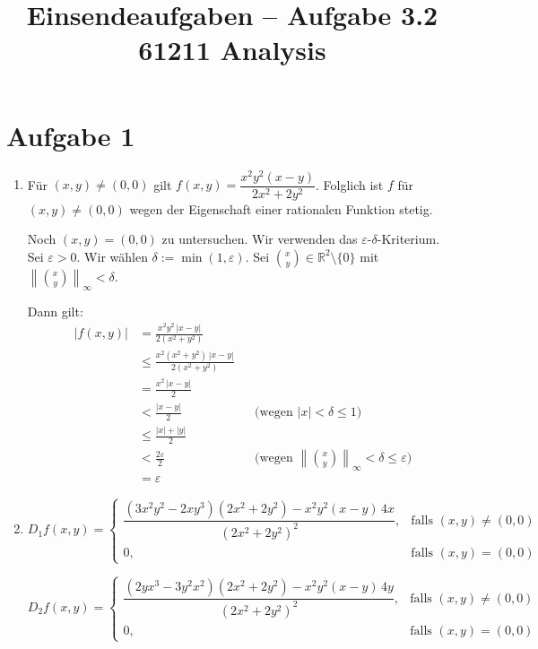 \documentclass[a4paper,12pt]{article}
\title{Einsendeaufgaben -- Aufgabe 3.2\\[0.5em]
\large 61211 Analysis}
\author{}
\date{}
\begin{document}
\maketitle

\section*{Aufgabe 1}

\begin{enumerate}[label=\alph*)]

    \item
    Für $(x,y) \neq (0,0)$ gilt $f(x,y) = \dfrac{x^2 y^2 (x-y)}{2x^2 + 2y^2}$.
    Folglich ist $f$ für $(x,y) \neq (0,0)$ wegen der Eigenschaft einer rationalen Funktion stetig.

    Noch $(x,y) = (0,0)$ zu untersuchen. Wir verwenden das $\varepsilon$-$\delta$-Kriterium.
    Sei $\varepsilon > 0$. Wir wählen $\delta := \min(1, \varepsilon)$.
    Sei $\binom{x}{y} \in \mathbb{R}^2 \setminus \{0\}$ mit $\left\|\binom{x}{y}\right\|_\infty < \delta$.

    Dann gilt:
    \begin{align*}
        |f(x,y)|
        &= \frac{x^2 y^2 \, |x-y|}{2(x^2+y^2)} \\
        &\leq \frac{x^2 (x^2+y^2) \, |x-y|}{2(x^2+y^2)} \\
        &= \frac{x^2 \, |x-y|}{2} \\
        &< \frac{|x-y|}{2} && \text{(wegen $|x| < \delta \leq 1$)} \\
        &\leq \frac{|x|+|y|}{2} \\
        &< \frac{2\varepsilon}{2} && \text{(wegen $\left\|\binom{x}{y}\right\|_\infty < \delta \leq \varepsilon$)} \\
        &= \varepsilon
    \end{align*}

    \item
    \[
        D_1 f(x,y) =
        \begin{cases}
            \dfrac{(3x^2 y^2 - 2xy^3)(2x^2+2y^2) - x^2 y^2 (x-y) \, 4x}{(2x^2+2y^2)^2}, & \text{falls } (x,y) \neq (0,0) \\[0.8em]
            0, & \text{falls } (x,y)=(0,0)
        \end{cases}
    \]

    \[
        D_2 f(x,y) =
        \begin{cases}
            \dfrac{(2yx^3 - 3y^2 x^2)(2x^2+2y^2) - x^2 y^2 (x-y) \, 4y}{(2x^2+2y^2)^2}, & \text{falls } (x,y) \neq (0,0) \\[0.8em]
            0, & \text{falls } (x,y)=(0,0)
        \end{cases}
    \]


\end{enumerate}
\end{document}
